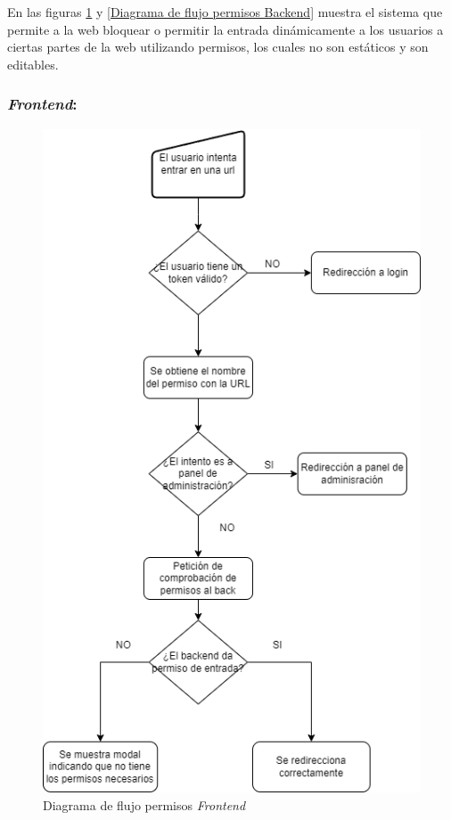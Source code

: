 En las figuras \ref{Diagrama de flujo permisos Frontend} y \ref{Diagrama de flujo permisos Backend} muestra el sistema que permite a la web bloquear o permitir la entrada dinámicamente a los usuarios a ciertas partes de la web utilizando permisos, los cuales no son estáticos y son editables.

\newpage
\subsubsection{\textit{Frontend}:}
\begin{figure}[htbp]
    \centering
    \includegraphics[width=0.6\linewidth]{Imagenes/Front permisos.png}
    \caption{Diagrama de flujo permisos \textit{Frontend}}
    \label{Diagrama de flujo permisos Frontend}
\end{figure}
\FloatBarrier

\newpage
